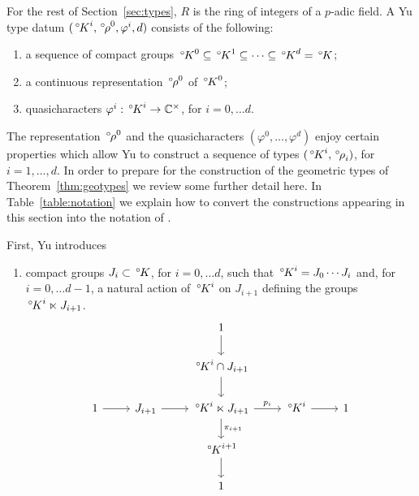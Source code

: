 \documentclass[10pt]{amsart}
\makeatletter
\theoremstyle{plain}
\theoremstyle{definition}
\newcommand{\CC}{{\mathbb{C}}}
\newcommand{\labitem}[2]{
\def\@itemlabel{\textbf{#1}}
\item
\def\@currentlabel{#1}\label{#2}}
\newcommand{\oK}{{\,^\circ \hskip-1pt K}}
\newcommand{\orho}{{\,^\circ \hskip-1pt \rho}}
\makeatother
\begin{document}
For the rest of Section~\ref{sec:types}, $R$ is the ring of integers of a $p$-adic field.
A Yu type datum $(\oK^i,\orho^0,\varphi^i,d)$ consists of the following:
\begin{enumerate}
\labitem{Y0}{Y0} a sequence of compact groups $\oK^0 \subseteq \oK^1 \subseteq \cdots \subseteq \oK^d = \oK$;
\labitem{Y1}{Y1} a continuous representation $\orho^0$ of $\oK^0$;
\labitem{Y2}{Y2} quasicharacters $\varphi^i : \oK^i \to \CC^\times$, for $i=0, \ldots d$.
\end{enumerate}
The representation $\orho^0$ and the quasicharacters $(\varphi^0, \ldots , \varphi^d)$ enjoy certain properties which allow Yu to construct a sequence of types $(\oK^i,\orho_i)$, for $i=1, \ldots, d$.
%
In order to prepare for the construction of the geometric types of Theorem~\ref{thm:geotypes}  we review some further detail here.
In Table~\ref{table:notation} we explain how to convert the constructions appearing in this section into the notation of \cite{yu:01a}.


First, Yu introduces 
\begin{enumerate}
\labitem{Y3}{Y3}
compact groups $J_i\subset \oK$, for $i=0, \ldots d$, such that 
$
\oK^i = J_0\cdots J_{i}
$ 
and, for $i=0, \ldots d-1$, a natural action of $\oK^i$ on $J_{i+1}$ defining the groups $\oK^i \ltimes J_{i+1}$.
\begin{equation}\label{eq:semiprod}
\begin{tikzcd}
\ && 1 \arrow{d} && \\
\ && \oK^{i}\cap J_{i+1}\arrow{d} && \\
1 \arrow{r} & J_{i+1} \arrow{r} & \oK^i \ltimes J_{i+1} \arrow{d}{\pi_{i+1}} \arrow{r}{p_i} & \oK^i \arrow{r} & 1\\
&& \oK^{i+1} \arrow{d}{} && \\
&& 1 &&
\end{tikzcd}
\end{equation}
\end{enumerate}
%
\end{document}

